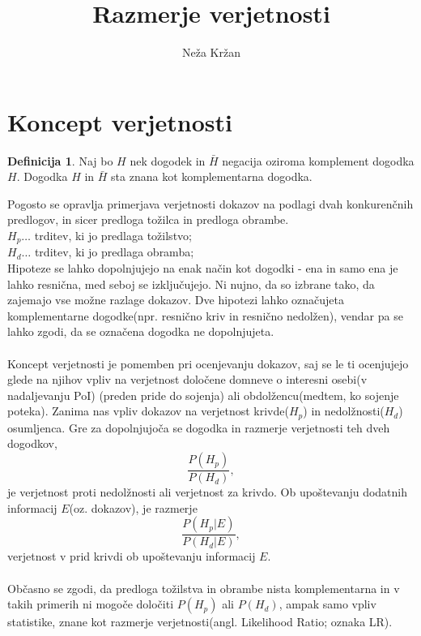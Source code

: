 \documentclass[12pt,a4paper]{amsart}
\theoremstyle{definition} %
\newtheorem{definicija}{Definicija}[section]
\theoremstyle{plain} %
\begin{document}
\title{Razmerje verjetnosti}
\author{Neža Kržan}
\maketitle

\section{Koncept verjetnosti}
\begin{definicija}
Naj bo $H$ nek dogodek in $\bar{H}$ negacija oziroma komplement dogodka $H$. Dogodka $H$ in $\bar{H}$ sta znana kot komplementarna dogodka.
\end{definicija}
Pogosto se opravlja primerjava verjetnosti dokazov na podlagi dvah konkurenčnih predlogov, in sicer predloga tožilca in predloga obrambe. \\
$H_p \dots$ trditev, ki jo predlaga tožilstvo;\\
$H_d \dots$ trditev, ki jo predlaga obramba;\\
Hipoteze se lahko dopolnjujejo na enak način kot dogodki - ena in samo ena je lahko resnična, med seboj se izključujejo. Ni nujno, da so izbrane tako, 
da zajemajo vse možne razlage dokazov. Dve hipotezi lahko označujeta komplementarne dogodke(npr. resnično kriv in resnično nedolžen), vendar pa se lahko zgodi, 
da se označena dogodka ne dopolnjujeta. \\\\
Koncept verjetnosti je pomemben pri ocenjevanju dokazov, saj se le ti ocenjujejo glede na njihov vpliv na verjetnost določene domneve o interesni 
osebi(v nadaljevanju PoI) (preden pride do sojenja) ali obdolžencu(medtem, ko sojenje poteka). Zanima nas vpliv dokazov na verjetnost krivde($H_p$) in 
nedolžnosti($H_d$) osumljenca. Gre za dopolnjujoča se dogodka in razmerje verjetnosti teh dveh dogodkov, 
\begin{equation}
    \frac{P(H_p)}{P(H_d)},
\end{equation}
je verjetnost proti nedolžnosti ali verjetnost za krivdo. Ob upoštevanju dodatnih informacij $E$(oz. dokazov), je razmerje
\begin{equation}
    \frac{P(H_p \lvert E)}{P(H_d \lvert E)},
\end{equation}
verjetnost v prid krivdi ob upoštevanju informacij $E$.\\\\
Občasno se zgodi, da predloga tožilstva in obrambe nista komplementarna in v takih primerih ni mogoče določiti $P(H_p)$ ali $P(H_d)$, ampak samo 
vpliv statistike, znane kot razmerje verjetnosti(angl. Likelihood Ratio; oznaka LR).
\end{document}
